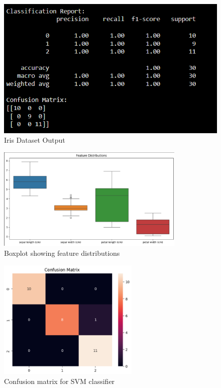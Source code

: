 \documentclass{article}
\begin{document}
\begin{figure}[h]
    \centering
    \caption{Iris Dataset Output}\includegraphics[width=0.8\linewidth]{Iris_output.png}
\end{figure}
\begin{figure}[h]
    \centering
     \caption{Boxplot showing feature distributions}
    \includegraphics[width=0.8\textwidth]{feature_distribution.png}
   
\end{figure}


\begin{figure}[h]
    \centering
    \caption{Confusion matrix for SVM classifier}
    \includegraphics[width=0.6\textwidth]{confusion_matrix.png}

\end{figure}
\end{document}
